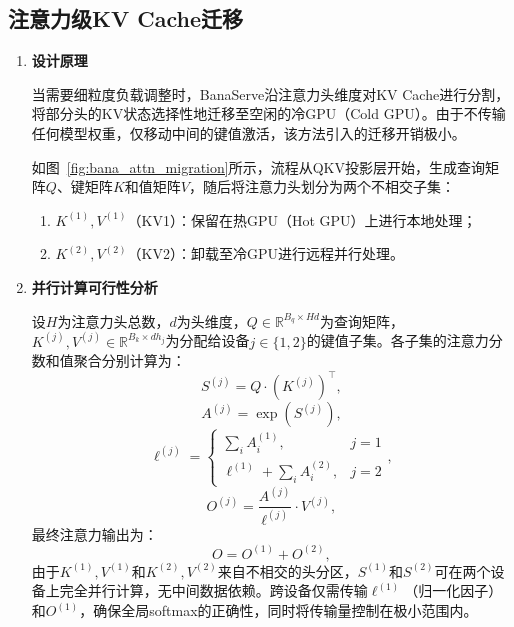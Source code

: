 \subsection{注意力级KV Cache迁移}
\begin{enumerate}
  
\item \textbf{设计原理}

当需要细粒度负载调整时，BanaServe沿注意力头维度对KV Cache进行分割，将部分头的KV状态选择性地迁移至空闲的冷GPU（Cold GPU）。由于不传输任何模型权重，仅移动中间的键值激活，该方法引入的迁移开销极小。

如图~\ref{fig:bana_attn_migration}所示，流程从QKV投影层开始，生成查询矩阵$Q$、键矩阵$K$和值矩阵$V$，随后将注意力头划分为两个不相交子集：
\begin{enumerate}
    \item $K^{(1)},V^{(1)}$（KV1）：保留在热GPU（Hot GPU）上进行本地处理；
    \item $K^{(2)},V^{(2)}$（KV2）：卸载至冷GPU进行远程并行处理。
\end{enumerate}

\item \textbf{并行计算可行性分析}

设$H$为注意力头总数，$d$为头维度，$Q \in \mathbb{R}^{B_q \times Hd}$为查询矩阵，$K^{(j)}, V^{(j)} \in \mathbb{R}^{B_k \times d h_j}$为分配给设备$j \in \{1,2\}$的键值子集。各子集的注意力分数和值聚合分别计算为：
\begin{equation}
    S^{(j)} = Q \cdot (K^{(j)})^\top,
    \label{eq:attn_score}
\end{equation}
\begin{equation}
    A^{(j)} = \exp\!\left(S^{(j)}\right),
    \label{eq:attn_softmax}
\end{equation}
\begin{equation}
    \ell^{(j)} = \begin{cases}
        \sum_i A^{(1)}_i, & j = 1 \\
        \ell^{(1)} + \sum_i A^{(2)}_i, & j = 2
    \end{cases},
    \label{eq:attn_norm}
\end{equation}
\begin{equation}
    O^{(j)} = \frac{A^{(j)}}{\ell^{(j)}} \cdot V^{(j)},
    \label{eq:attn_output}
\end{equation}
最终注意力输出为：
\begin{equation}
    O = O^{(1)} + O^{(2)},
    \label{eq:attn_final}
\end{equation}
由于$K^{(1)},V^{(1)}$和$K^{(2)},V^{(2)}$来自不相交的头分区，$S^{(1)}$和$S^{(2)}$可在两个设备上完全并行计算，无中间数据依赖。跨设备仅需传输$\ell^{(1)}$（归一化因子）和$O^{(1)}$，确保全局softmax的正确性，同时将传输量控制在极小范围内。


\end{enumerate}
